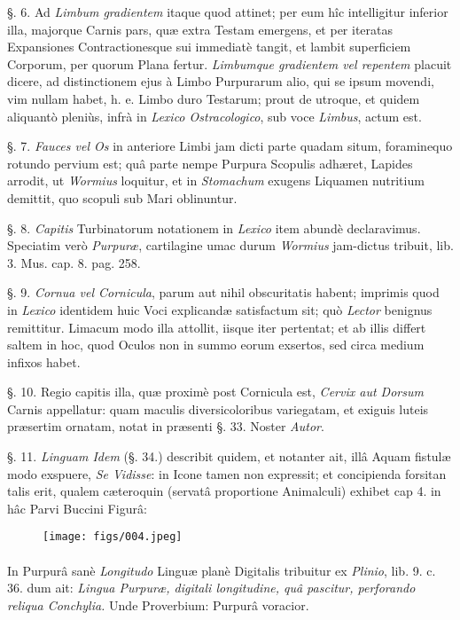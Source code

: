 \documentclass[a4paper, 11pt, oneside, polutonikogreek, german]{article}
\begin{document}
§. 6. Ad \emph{Limbum gradientem} itaque quod attinet; per eum hîc intelligitur inferior illa, majorque Carnis pars, quæ extra Testam emergens, et per iteratas Expansiones Contractionesque sui immediatè tangit, et lambit superficiem Corporum, per quorum Plana fertur. \emph{Limbumque gradientem vel repentem} placuit dicere, ad distinctionem ejus à Limbo Purpurarum alio, qui se ipsum movendi, vim nullam habet, h. e. Limbo duro Testarum; prout de utroque, et quidem aliquantò pleniùs, infrà in \emph{Lexico Ostracologico}, sub voce \emph{Limbus}, actum est.

§. 7. \emph{Fauces vel Os} in anteriore Limbi jam dicti parte quadam situm, foraminequo rotundo pervium est; quâ parte nempe Purpura Scopulis adhæret, Lapides arrodit, ut \emph{Wormius} loquitur, et in \emph{Stomachum} exugens Liquamen nutritium demittit, quo scopuli sub Mari oblinuntur.

§. 8. \emph{Capitis} Turbinatorum notationem in \emph{Lexico} item abundè declaravimus. Speciatim verò \emph{Purpuræ}, cartilagine umac durum \emph{Wormius} jam-dictus tribuit, lib. 3. Mus. cap. 8. pag. 258.

§. 9. \emph{Cornua vel Cornicula}, parum aut nihil obscuritatis habent; imprimis quod in \emph{Lexico} identidem huic Voci explicandæ satisfactum sit; quò \emph{Lector} benignus remittitur. Limacum modo illa attollit, iisque iter pertentat; et ab illis differt saltem in hoc, quod Oculos non in summo eorum exsertos, sed circa medium infixos habet.

§. 10. Regio capitis illa, quæ proximè post Cornicula est, \emph{Cervix aut Dorsum} Carnis appellatur: quam maculis diversicoloribus variegatam, et exiguis luteis præsertim ornatam, notat in præsenti §. 33. Noster \emph{Autor}.

§. 11. \emph{Linguam Idem} (§. 34.) describit quidem, et notanter ait, illâ Aquam fistulæ modo exspuere, \emph{Se Vidisse}: in Icone tamen non expressit; et concipienda forsitan talis erit, qualem cæteroquin (servatâ proportione Animalculi) exhibet cap 4. in hâc Parvi Buccini Figurâ:

\begin{figure}[H]
\centering
\texttt{[image: figs/004.jpeg]}
\end{figure}
\paragraph{}
In Purpurâ sanè \emph{Longitudo} Linguæ planè Digitalis tribuitur ex \emph{Plinio}, lib. 9. c. 36. dum ait: \emph{Lingua Purpuræ, digitali longitudine, quâ pascitur, perforando reliqua Conchylia.} Unde Proverbium: Purpurâ voracior.
\end{document}
